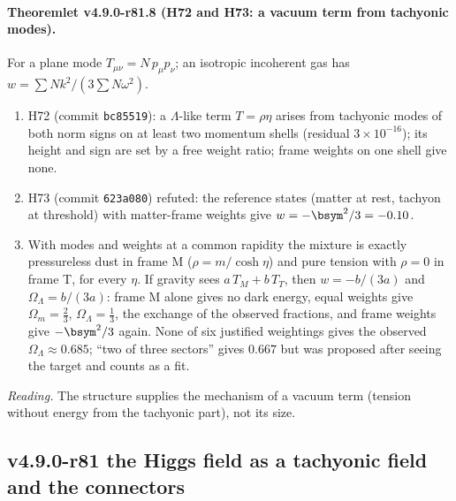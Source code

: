 \paragraph{Theoremlet v4.9.0-r81.8 (H72 and H73: a vacuum term from tachyonic modes).}
For a plane mode \(T_{\mu\nu}=N\,p_\mu p_\nu\); an isotropic incoherent gas has \(w=\sum N k^2/(3\sum N\omega^2)\).
\begin{enumerate}[leftmargin=2em]
\item[(a)] H72 (commit \texttt{bc85519}): a \(\Lambda\)-like term \(T=\rho\eta\) arises from tachyonic modes of both norm signs on at least two
momentum shells (residual \(3\times10^{-16}\)); its height and sign are set by a free weight ratio; frame weights on one shell give none.
\item[(b)] H73 (commit \texttt{623a080}) refuted: the reference states (matter at rest, tachyon at threshold) with matter-frame weights
give \(w=-\bsym^2/3=-0.10\).
\item[(c)] With modes and weights at a common rapidity the mixture is exactly pressureless dust in frame M (\(\rho=m/\cosh\eta\)) and pure
tension with \(\rho=0\) in frame T, for every \(\eta\).  If gravity sees \(a\,T_M+b\,T_T\), then \(w=-b/(3a)\) and
\(\Omega_\Lambda=b/(3a)\): frame M alone gives no dark energy, equal weights give \(\Omega_m=\tfrac23\), \(\Omega_\Lambda=\tfrac13\), the
exchange of the observed fractions, and frame weights give \(-\bsym^2/3\) again.  None of six justified weightings gives the observed
\(\Omega_\Lambda\approx0.685\); ``two of three sectors'' gives \(0.667\) but was proposed after seeing the target and counts as a fit.
\end{enumerate}
\emph{Reading.}  The structure supplies the mechanism of a vacuum term (tension without energy from the tachyonic part), not its size.

\subsection*{v4.9.0-r81 the Higgs field as a tachyonic field and the connectors}
\label{subsec:v490-r81-connectors}

